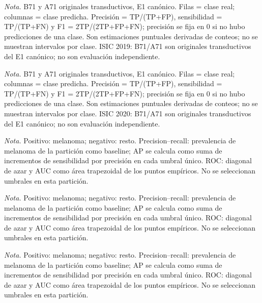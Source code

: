 \caption{Precisión, sensibilidad y F1 por diagnóstico para B71 y A71 en la partición indicada. Con n = 5.067 en ISIC 2019}
\textit{Nota.} B71 y A71 originales transductivos, E1 canónico. Filas = clase real; columnas = clase predicha. Precisión = TP/(TP+FP), sensibilidad = TP/(TP+FN) y F1 = 2TP/(2TP+FP+FN); precisión se fija en 0 si no hubo predicciones de una clase. Son estimaciones puntuales derivadas de conteos; no se muestran intervalos por clase. ISIC 2019: B71/A71 son originales transductivos del E1 canónico; no son evaluación independiente.

\caption{Precisión, sensibilidad y F1 por diagnóstico para B71 y A71 en la partición indicada. Con n = 6.660 en ISIC 2020}
\textit{Nota.} B71 y A71 originales transductivos, E1 canónico. Filas = clase real; columnas = clase predicha. Precisión = TP/(TP+FP), sensibilidad = TP/(TP+FN) y F1 = 2TP/(2TP+FP+FN); precisión se fija en 0 si no hubo predicciones de una clase. Son estimaciones puntuales derivadas de conteos; no se muestran intervalos por clase. ISIC 2020: B71/A71 son originales transductivos del E1 canónico; no son evaluación independiente.

\caption{Curvas de precisión–sensibilidad y ROC de melanoma frente al resto en HAM10000 · E3b canónico.}
\textit{Nota.} Positivo: melanoma; negativo: resto. Precision–recall: prevalencia de melanoma de la partición como baseline; AP se calcula como suma de incrementos de sensibilidad por precisión en cada umbral único. ROC: diagonal de azar y AUC como área trapezoidal de los puntos empíricos. No se seleccionan umbrales en esta partición.

\caption{Curvas de precisión–sensibilidad y ROC de melanoma frente al resto en ISIC 2019 · E1 canónico.}
\textit{Nota.} Positivo: melanoma; negativo: resto. Precision–recall: prevalencia de melanoma de la partición como baseline; AP se calcula como suma de incrementos de sensibilidad por precisión en cada umbral único. ROC: diagonal de azar y AUC como área trapezoidal de los puntos empíricos. No se seleccionan umbrales en esta partición.

\caption{Curvas de precisión–sensibilidad y ROC de melanoma frente al resto en ISIC 2020 · E1 canónico.}
\textit{Nota.} Positivo: melanoma; negativo: resto. Precision–recall: prevalencia de melanoma de la partición como baseline; AP se calcula como suma de incrementos de sensibilidad por precisión en cada umbral único. ROC: diagonal de azar y AUC como área trapezoidal de los puntos empíricos. No se seleccionan umbrales en esta partición.

